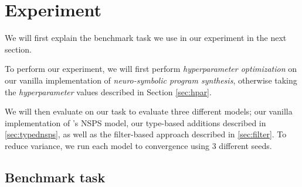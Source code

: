 \documentclass{article}
\begin{document}

\section{Experiment} \label{sec:experiment}

We will first explain the benchmark task we use in our experiment in
the next section.

To perform our experiment, we will
first perform \emph{hyperparameter optimization} on our vanilla implementation of \emph{neuro-symbolic program synthesis},
otherwise taking the \emph{hyperparameter} values described in Section \ref{sec:hpar}.

We will then evaluate on our task to evaluate three different models;
our vanilla implementation of \citet{nsps}'s NSPS model,
our type-based additions described in \ref{sec:typednsps},
as well as the filter-based approach described in \ref{sec:filter}.
To reduce variance, we run each model to convergence using $3$ different seeds.

\subsection{Benchmark task} \label{sec:task}

\end{document}
